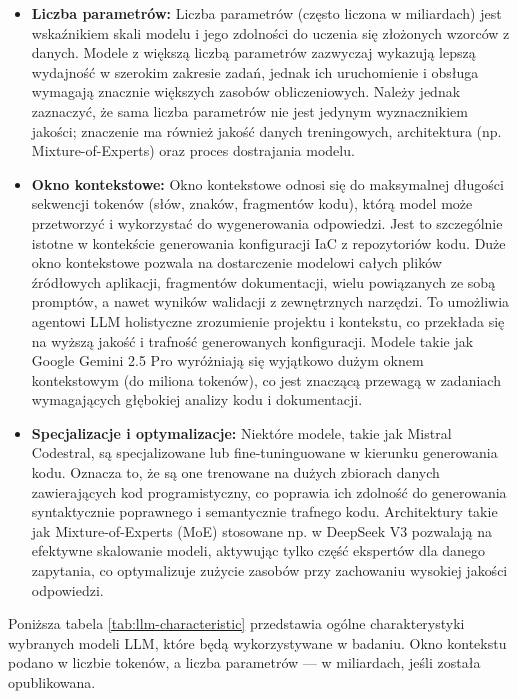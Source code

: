 \begin{itemize}
    \item \textbf{Liczba parametrów:} Liczba parametrów (często liczona w miliardach) jest wskaźnikiem skali modelu i jego zdolności do uczenia się złożonych wzorców z danych. Modele z większą liczbą parametrów zazwyczaj wykazują lepszą wydajność w szerokim zakresie zadań, jednak ich uruchomienie i obsługa wymagają znacznie większych zasobów obliczeniowych. Należy jednak zaznaczyć, że sama liczba parametrów nie jest jedynym wyznacznikiem jakości; znaczenie ma również jakość danych treningowych, architektura (np. Mixture-of-Experts) oraz proces dostrajania modelu.
    \item \textbf{Okno kontekstowe:} Okno kontekstowe odnosi się do maksymalnej długości sekwencji tokenów (słów, znaków, fragmentów kodu), którą model może przetworzyć i wykorzystać do wygenerowania odpowiedzi. Jest to szczególnie istotne w kontekście generowania konfiguracji IaC z repozytoriów kodu. Duże okno kontekstowe pozwala na dostarczenie modelowi całych plików źródłowych aplikacji, fragmentów dokumentacji, wielu powiązanych ze sobą promptów, a nawet wyników walidacji z zewnętrznych narzędzi. To umożliwia agentowi LLM holistyczne zrozumienie projektu i kontekstu, co przekłada się na wyższą jakość i trafność generowanych konfiguracji. Modele takie jak Google Gemini 2.5 Pro wyróżniają się wyjątkowo dużym oknem kontekstowym (do miliona tokenów), co jest znaczącą przewagą w zadaniach wymagających głębokiej analizy kodu i dokumentacji.
    \item \textbf{Specjalizacje i optymalizacje:} Niektóre modele, takie jak Mistral Codestral, są specjalizowane lub fine-tuninguowane w kierunku generowania kodu. Oznacza to, że są one trenowane na dużych zbiorach danych zawierających kod programistyczny, co poprawia ich zdolność do generowania syntaktycznie poprawnego i semantycznie trafnego kodu. Architektury takie jak Mixture-of-Experts (MoE) stosowane np. w DeepSeek V3 pozwalają na efektywne skalowanie modeli, aktywując tylko część ekspertów dla danego zapytania, co optymalizuje zużycie zasobów przy zachowaniu wysokiej jakości odpowiedzi.
\end{itemize}

Poniższa tabela \ref{tab:llm-characteristic} przedstawia ogólne charakterystyki wybranych modeli LLM, które będą wykorzystywane w badaniu. Okno kontekstu podano w liczbie tokenów, a liczba parametrów — w miliardach, jeśli została opublikowana.

